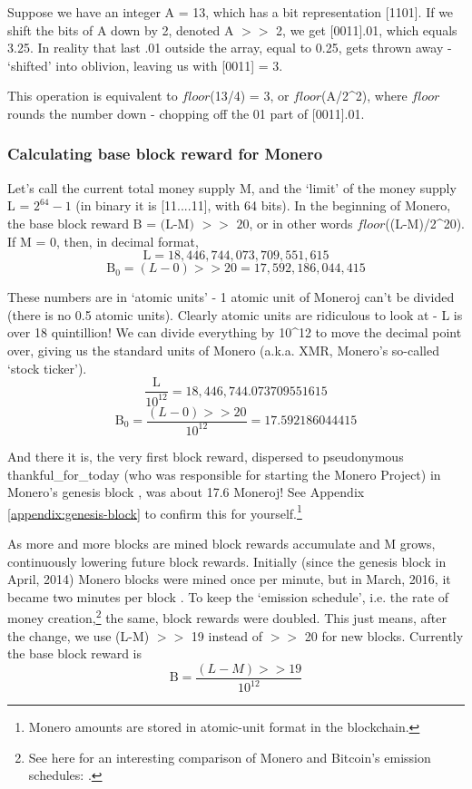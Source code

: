 Suppose we have an integer A = 13, which has a bit representation [1101]. If we shift the bits of A down by 2, denoted A $>>$ 2, we get [0011].01, which equals 3.25. In reality that last .01 outside the array, equal to 0.25, gets thrown away - `shifted' into oblivion, leaving us with [0011] = 3. 

This operation is equivalent to $\mathit{floor}$(13/4) = 3, or $\mathit{floor}$(A/2\^{}2), where $\mathit{floor}$ rounds the number down - chopping off the 01 part of [0011].01.

        
\subsubsection*{Calculating base block reward for Monero}

Let's call the current total money supply M, and the `limit' of the money supply L = $2^{64} - 1$ (in binary it is [11....11], with 64 bits). In the beginning of Monero, the base block reward \(\textrm{B = (L-M) $>>$ 20}\), or in other words $\mathit{floor}$((L-M)/2\^{}20). If M = 0, then, in decimal format,\\
\[ \textrm{L} = 18,446,744,073,709,551,615 \]
\[ \textrm{B}_0 = (L-0) >> 20 = 17,592,186,044,415 \]

These numbers are in `atomic units' - 1 atomic unit of Moneroj can't be divided (there is no 0.5 atomic units). Clearly atomic units are ridiculous to look at - L is over 18 quintillion! We can divide everything by 10\^{}12 to move the decimal point over, giving us the standard units of Monero (a.k.a. XMR, Monero's so-called `stock ticker').
\[ \frac{\textrm{L}}{10^{12}} = 18,446,744.073709551615 \]
\[ \textrm{B}_0 = \frac{(L-0) >> 20}{10^{12}} = 17.592186044415 \]

And there it is, the very first block reward, dispersed to pseudonymous thankful\_for\_today (who was responsible for starting the Monero Project) in Monero's genesis block \cite{bitmonero-launched}, was about 17.6 Moneroj! See Appendix \ref{appendix:genesis-block} to confirm this for yourself.\footnote{Monero amounts are stored in atomic-unit format in the blockchain.}

As more and more blocks are mined block rewards accumulate and M grows, continuously lowering future block rewards. Initially (since the genesis block in April, 2014) Monero blocks were mined once per minute, but in March, 2016, it became two minutes per block \cite{monero-0.9.3}. To keep the `emission schedule', i.e. the rate of money creation,\footnote{See here for an interesting comparison of Monero and Bitcoin's emission schedules: \cite{monero-coin-emission}.} the same, block rewards were doubled. This just means, after the change, we use (L-M) $>>$ 19 instead of $>>$ 20 for new blocks. Currently the base block reward is
\[ \textrm{B} = \frac{(L-M) >> 19}{10^{12}} \]


